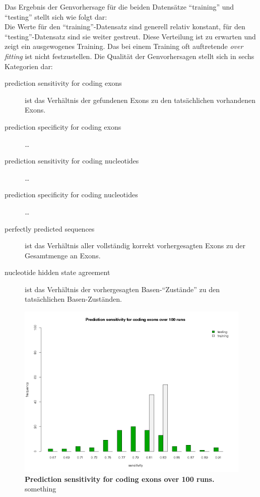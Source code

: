 Das Ergebnis der Genvorhersage für die beiden Datensätze \enquote{training} und
\enquote{testing} stellt sich wie folgt dar:\\
Die Werte für den \enquote{training}-Datensatz sind generell relativ konstant,
für den \enquote{testing}-Datensatz sind sie weiter gestreut.
Diese Verteilung ist zu erwarten und zeigt ein ausgewogenes Training.
Das bei einem Training oft auftretende \textit{over fitting} ist nicht
festzustellen.
Die Qualität der Genvorhersagen stellt sich in sechs Kategorien dar:
\begin{description}
\item[prediction sensitivity for coding exons] ist das Verhältnis
der gefundenen Exons zu den tatsächlichen vorhandenen Exons.
\item[prediction specificity for coding exons] \ldots
\item[prediction sensitivity for coding nucleotides] \ldots
\item[prediction specificity for coding nucleotides] \ldots
\item[perfectly predicted sequences] ist das Verhältnis aller
vollständig korrekt vorhergesagten Exons zu der Gesamtmenge an Exons.
\item[nucleotide hidden state agreement] ist das Verhältnis der vorhergesagten
Basen-\enquote{Zustände} zu den tatsächlichen Basen-Zuständen.
\end{description}

\begin{figure}[ht]
	\begin{center}
		\includegraphics[scale=0.42]{pics/codingExons_sens.png}
	\caption[Prediction sensitivity for coding exons over 100 runs]{
	\textbf{Prediction sensitivity for coding exons over 100 runs.}
	something}
	\end{center}
	\label{fig:codingExons_sens}
\end{figure}

